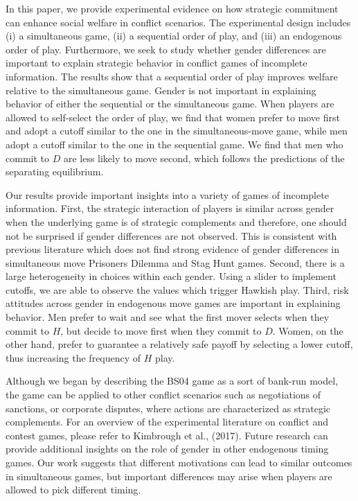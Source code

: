 \documentclass[12pt, letterpaper]{article}
\theoremstyle{plain}
\begin{document}
In this paper, we provide experimental evidence on how strategic commitment can enhance social welfare in conflict scenarios. The experimental design includes (i) a simultaneous game, (ii) a sequential order of play, and (iii) an endogenous order of play. Furthermore, we seek to study whether gender differences are important to explain strategic behavior in conflict games of incomplete information. The results show that a sequential order of play improves welfare relative to the simultaneous game. Gender is not important in explaining behavior of either the sequential or the simultaneous game. When players are allowed to self-select the order of play, we find that women prefer to move first and adopt a cutoff similar to the one in the simultaneous-move game, while men adopt a cutoff similar to the one in the sequential game. We find that men who commit to $D$ are less likely to move second, which follows the predictions of the separating equilibrium. 


Our results provide important insights into a variety of games of incomplete information. First, the strategic interaction of players is similar across gender when the underlying game is of strategic complements and therefore, one should not be surprised if gender differences are not observed. This is consistent with previous literature which does not find strong evidence of gender differences in simultaneous move Prisoners Dilemma and Stag Hunt games. Second, there is a large heterogeneity in choices within each gender. Using a slider to implement cutoffs, we are able to observe the values which trigger Hawkish play. Third, risk attitudes across gender in endogenous move games are important in explaining behavior. Men prefer to wait and see what the first mover selects when they commit to $H$, but decide to move first when they commit to $D$. Women, on the other hand, prefer to guarantee a relatively safe payoff by selecting a lower cutoff, thus increasing the frequency of $H$ play.  

Although we began by describing the BS04 game as a sort of bank-run model, the game can be applied to other conflict scenarios such as negotiations of sanctions, or corporate disputes, where actions are characterized as strategic complements. For an overview of the experimental literature on conflict and contest games, please refer to Kimbrough et al., (2017). Future research can provide additional insights on the role of gender in other endogenous timing games. Our work suggests that different motivations can lead to similar outcomes in simultaneous games, but important differences may arise when players are allowed to pick different timing. 
\end{document}
